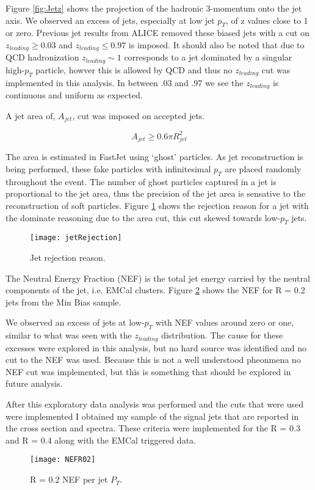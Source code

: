Figure \ref{fig:Jetz} shows the projection of the hadronic 3-momentum onto the jet axis.  We observed an excess of jets, especially at low jet $p_{T}$, of z values close to 1 or zero.  Previous jet results from ALICE removed these biased jets with a cut on $ z_{leading} \geq 0.03$ and $z_{leading} \leq 0.97$ is imposed.  It should also be noted that due to QCD hadronization $z_{leading} \sim 1$ corresponds to a jet dominated by a singular high-$p_{T}$ particle, howver this is allowed by QCD and thus no $z_{leading}$ cut was implemented in this analysis.  In between .03 and .97 we see the $z_{leading}$ is continuous and uniform as expected.  

A jet area of, $A_{jet}$, cut was imposed on accepted jets.

\begin{equation}
A_{jet} \geq 0.6 \pi R_{jet}^{2}
\label{eq:AreaJet}
\end{equation}

The area is estimated in FastJet using `ghost' particles.  As jet reconstruction is being performed, these fake particles with infinitesimal $p_{T}$ are placed randomly throughout the event.  The number of ghost particles captured in a jet is proportional to the jet area, thus the precision of the jet area is sensative to the reconstruction of soft particles.  Figure \ref{fig:jetRejection} shows the rejection reason for a jet with the dominate reasoning due to the area cut, this cut skewed towards low-$p_{T}$ jets.

\begin{figure}[h]
\texttt{[image: jetRejection]}
\centering
\caption{Jet rejection reason.}
\label{fig:jetRejection}
\end{figure}


The Neutral Energy Fraction (NEF) is the total jet energy carried by the neutral components of the jet, i.e. EMCal clusters.  Figure \ref{fig:JetNEF} shows the NEF for R = 0.2 jets from the Min Bias sample.


We observed an excess of jets at low-$p_{T}$ with NEF values around zero or one, similar to what was seen with the $z_{leading}$ distribution.  The cause for these excesses were explored in this analysis, but no hard source was identified and no cut to the NEF was used.  Because this is not a well understood pheonmena no NEF cut was implemented, but this is something that should be explored in future analysis.


After this exploratory data analysis was performed and the cuts that were used were implemented I obtained my sample of the signal jets that are reported in the cross section and spectra.  These criteria were implemented for the R = 0.3 and R = 0.4 along with the EMCal triggered data.

\begin{figure}[h]
\texttt{[image: NEFR02]}
\centering
\caption{R = 0.2 NEF per jet $P_{T}$.}
\label{fig:JetNEF}
\end{figure}




